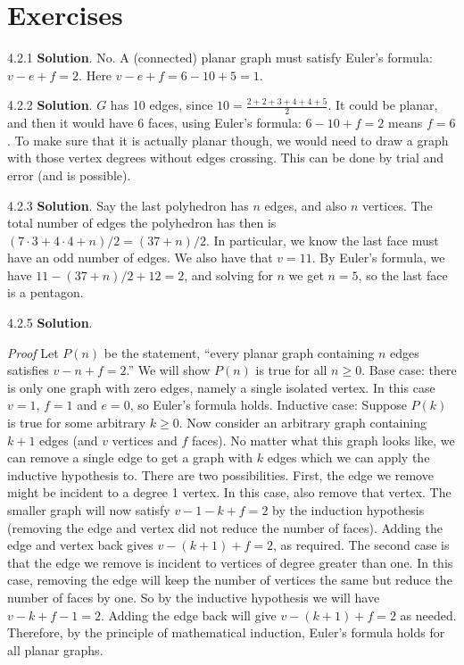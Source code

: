 \documentclass[11pt,]{book}
\makeatletter
\theoremstyle{ptxplainnotitle}
\theoremstyle{ptxplaintitle}
\renewcommand*{\proofname}{Proof}
\renewenvironment{proof}[1][\proofname]{\par
  \pushQED{\qed}%
  \normalfont \topsep6\p@\@plus6\p@\relax
  \trivlist
  \item\relax
    {\itshape
    #1\@addpunct{.}}\hspace\labelsep\ignorespaces
}{%
  \popQED\endtrivlist\@endpefalse
}
\theoremstyle{ptxdefinitionnotitle}
\theoremstyle{ptxdefinitiontitle}
\theoremstyle{ptxdefinitionnotitle}
\theoremstyle{ptxdefinitiontitle}
\theoremstyle{ptxdefinitionnotitle}
\theoremstyle{ptxdefinitiontitle}
\theoremstyle{ptxdefinitiontitlenonumber}
\theoremstyle{ptxdefinitiontitlenonumber}
\numberwithin{equation}{chapter}
\makeatother
\begin{document}
\section*{Exercises}
\begin{divisionexercise}{4.2.1}
\textbf{Solution}.\quad%
\hypertarget{p-2704}{}%
No. A (connected) planar graph must satisfy Euler's formula: \(v - e + f = 2\). Here \(v - e + f = 6 - 10 + 5 = 1\).%
\end{divisionexercise}%
\begin{divisionexercise}{4.2.2}
\textbf{Solution}.\quad%
\hypertarget{p-2706}{}%
\(G\) has 10 edges, since \(10 = \frac{2+2+3+4+4+5}{2}\). It could be planar, and then it would have 6 faces, using Euler's formula: \(6-10+f = 2\) means \(f = 6\).  To make sure that it is actually planar though, we would need to draw a graph with those vertex degrees without edges crossing.  This can be done by trial and error (and is possible).%
\end{divisionexercise}%
\begin{divisionexercise}{4.2.3}
\textbf{Solution}.\quad%
\hypertarget{p-2708}{}%
Say the last polyhedron has \(n\) edges, and also \(n\) vertices. The total number of edges the polyhedron has then is \((7 \cdot 3 + 4 \cdot 4 + n)/2 = (37 + n)/2\). In particular, we know the last face must have an odd number of edges. We also have that \(v = 11 \).  By Euler's formula, we have \(11 - (37+n)/2 + 12 = 2\), and solving for \(n\) we get \(n = 5\), so the last face is a pentagon.%
\end{divisionexercise}%
\begin{divisionexercise}{4.2.5}
\textbf{Solution}.\quad%
\begin{proof}\hypertarget{proof-40}{}
\hypertarget{p-2714}{}%
Let \(P(n)\) be the statement, ``every planar graph containing \(n\) edges satisfies \(v - n + f = 2\).'' We will show \(P(n)\) is true for all \(n \ge 0\). Base case: there is only one graph with zero edges, namely a single isolated vertex. In this case \(v = 1\), \(f = 1\) and \(e = 0\), so Euler's formula holds. Inductive case: Suppose \(P(k)\) is true for some arbitrary \(k \ge 0\). Now consider an arbitrary graph containing \(k+1\) edges (and \(v\) vertices and \(f\) faces). No matter what this graph looks like, we can remove a single edge to get a graph with \(k\) edges which we can apply the inductive hypothesis to. There are two possibilities. First, the edge we remove might be incident to a degree 1 vertex. In this case, also remove that vertex. The smaller graph will now satisfy \(v-1 - k + f = 2\) by the induction hypothesis (removing the edge and vertex did not reduce the number of faces). Adding the edge and vertex back gives \(v - (k+1) + f = 2\), as required. The second case is that the edge we remove is incident to vertices of degree greater than one. In this case, removing the edge will keep the number of vertices the same but reduce the number of faces by one. So by the inductive hypothesis we will have \(v - k + f-1 = 2\). Adding the edge back will give \(v - (k+1) + f = 2\) as needed. Therefore, by the principle of mathematical induction, Euler's formula holds for all planar graphs.%
\end{proof}
\end{divisionexercise}%
\end{document}

